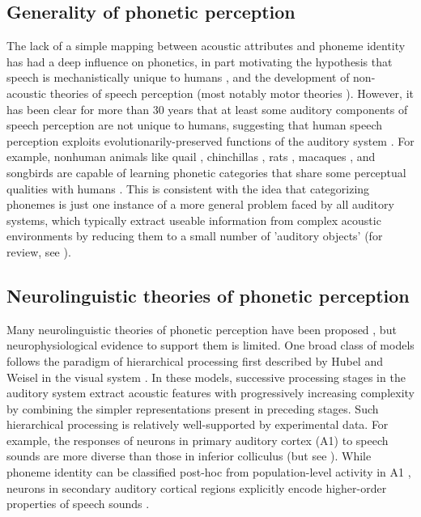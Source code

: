 \documentclass[11pt]{article}\usepackage[]{graphicx}\usepackage[]{color}
\begin{document}
\subsection{Generality of phonetic perception}

The lack of a simple mapping between acoustic attributes and phoneme identity has had a deep influence on phonetics, in part motivating the hypothesis that speech is mechanistically unique to humans \cite{Lieberman1984}, and the development of non-acoustic theories of speech perception (most notably motor theories \cite{Diehl2004,Liberman1967,Liberman1985}). However, it has been clear for more than 30 years that at least some auditory components of speech perception are not unique to humans, suggesting that human speech perception exploits evolutionarily-preserved functions of the auditory system \cite{Kluender1987,Carbonell2014,Ghazanfar1999,Bornkessel-Schlesewsky2015}. For example, nonhuman animals like quail \cite{Kluender1987, Kluender1994}, chinchillas \cite{Kuhl1978}, rats \cite{Engineer2015}, macaques \cite{Kuhl1983}, and songbirds \cite{Dooling1995} are capable of learning phonetic categories that share some perceptual qualities with humans \cite{Lotto1997,Kluender2000}. This is consistent with the idea that categorizing phonemes is just one instance of a more general problem faced by all auditory systems, which typically extract useable information from complex acoustic environments by reducing them to a small number of 'auditory objects' (for review, see \cite{Bizley2013}).%
%
\subsection{Neurolinguistic theories of phonetic perception}

Many neurolinguistic theories of phonetic perception have been proposed \cite{Rauschecker2009a,Strauss2007,Kluender2013a,Liberman1985,Gaskell1997}, but neurophysiological evidence to support them is limited. One broad class of models follows the paradigm of hierarchical processing first described by Hubel and Weisel in the visual system \cite{Rauschecker2009a,Hubel1962,Strauss2007}. In these models, successive processing stages in the auditory system extract acoustic features with progressively increasing complexity by combining the simpler representations present in preceding stages. Such hierarchical processing is relatively well-supported by experimental data. For example, the responses of neurons in primary auditory cortex (A1) to speech sounds are more diverse than those in inferior colliculus \cite{Ranasinghe2013} (but see \cite{Bartlett2013}). While phoneme identity can be classified post-hoc from population-level activity in A1 \cite{Centanni2013,Engineer2008,Steinschneider2003}, neurons in secondary auditory cortical regions explicitly encode higher-order properties of speech sounds \cite{Mesgarani2014,Belin2000a,Chang2010,Pasley2012,Bidelman2013}.
\end{document}
